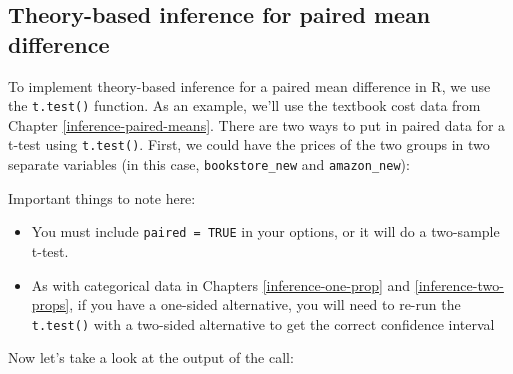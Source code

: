 \documentclass[
  10pt,
  openany]{book}
\newenvironment{Shaded}{\begin{snugshade}}{\end{snugshade}}
\newcommand{\AttributeTok}[1]{\textcolor[rgb]{0.13,0.29,0.53}{#1}}
\newcommand{\CommentTok}[1]{\textcolor[rgb]{0.56,0.35,0.01}{\textit{#1}}}
\newcommand{\ConstantTok}[1]{\textcolor[rgb]{0.56,0.35,0.01}{#1}}
\newcommand{\FloatTok}[1]{\textcolor[rgb]{0.00,0.00,0.81}{#1}}
\newcommand{\FunctionTok}[1]{\textcolor[rgb]{0.13,0.29,0.53}{\textbf{#1}}}
\newcommand{\NormalTok}[1]{#1}
\newcommand{\SpecialCharTok}[1]{\textcolor[rgb]{0.81,0.36,0.00}{\textbf{#1}}}
\newcommand{\StringTok}[1]{\textcolor[rgb]{0.31,0.60,0.02}{#1}}
\providecommand{\tightlist}{%
  \setlength{\itemsep}{0pt}\setlength{\parskip}{0pt}}
\theoremstyle{definition}
\theoremstyle{definition}
\theoremstyle{definition}
\theoremstyle{definition}
\theoremstyle{remark}
\begin{document}
\subsection*{Theory-based inference for paired mean difference}\label{theory-based-inference-for-paired-mean-difference}

To implement theory-based inference for a paired mean difference in R, we use the \texttt{t.test()} function. As an example, we'll use the textbook cost data from Chapter \ref{inference-paired-means}. There are two ways to put in paired data for a t-test using \texttt{t.test()}. First, we could have the prices of the two groups in two separate variables (in this case, \texttt{bookstore\_new} and \texttt{amazon\_new}):

\begin{Shaded}
\end{Shaded}

Important things to note here:

\begin{itemize}
\tightlist
\item
  You must include \texttt{paired\ =\ TRUE} in your options, or it will do a two-sample t-test.
\item
  As with categorical data in Chapters \ref{inference-one-prop} and \ref{inference-two-props}, if you have a one-sided alternative, you will need to re-run the \texttt{t.test()} with a two-sided alternative to get the correct confidence interval
\end{itemize}

Now let's take a look at the output of the call:
\end{document}
